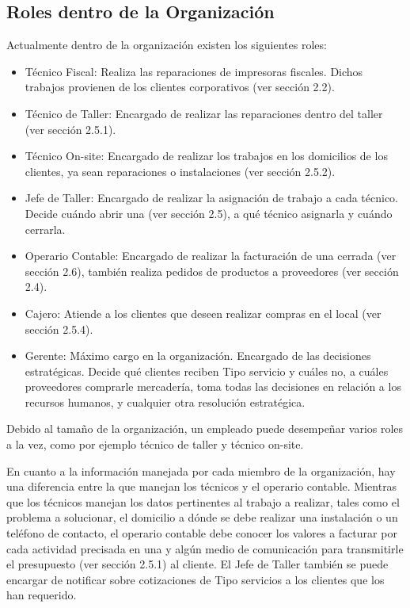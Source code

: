 \documentclass[12pt]{extarticle}
\begin{document}
\begin{spacing}{1.2}
    \pagebreak
    \subsection{Roles dentro de la Organización}
    Actualmente dentro de la organización existen los siguientes roles:
    \begin{itemize}
        \item Técnico Fiscal: Realiza las reparaciones de impresoras fiscales. Dichos trabajos provienen de los clientes corporativos (ver sección 2.2).
        \item Técnico de Taller: Encargado de realizar las reparaciones dentro del taller (ver sección 2.5.1). 
        \item Técnico On-site: Encargado de realizar los trabajos en los domicilios de los clientes, ya sean reparaciones o instalaciones (ver sección 2.5.2).
        \item Jefe de Taller: Encargado de realizar la asignación de trabajo a cada técnico. Decide cuándo abrir una \OT{} (ver sección 2.5), a qué técnico asignarla y cuándo cerrarla.
        \item Operario Contable: Encargado de realizar la facturación de una \OT{} cerrada (ver sección 2.6), también realiza pedidos de productos a proveedores (ver sección 2.4).
        \item Cajero: Atiende a los clientes que deseen realizar compras en el local (ver sección 2.5.4).
        \item Gerente: Máximo cargo en la organización. Encargado de las decisiones estratégicas. Decide qué clientes reciben Tipo servicio y cuáles no, a cuáles proveedores comprarle mercadería, toma todas las decisiones en relación a los recursos humanos, y cualquier otra resolución estratégica.  
    \end{itemize}
    

    Debido al tamaño de la organización, un empleado puede desempeñar varios roles a la vez, como por ejemplo técnico de taller y técnico on-site.  

    En cuanto a la información manejada por cada miembro de la organización, hay una diferencia entre la que manejan los técnicos y el operario contable. Mientras que los técnicos manejan los datos pertinentes al trabajo a realizar, tales como el problema a solucionar, el domicilio a dónde se debe realizar una instalación o un teléfono de contacto, el operario contable debe conocer los valores a facturar por cada actividad precisada en una \OT{} y algún medio de comunicación para transmitirle el presupuesto (ver sección 2.5.1) al cliente. El Jefe de Taller también se puede encargar de notificar sobre cotizaciones de Tipo servicios a los clientes que los han requerido.


\end{spacing}
\end{document}
